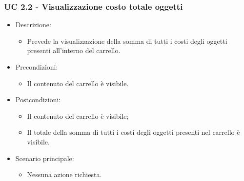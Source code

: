 \subsubsection{UC 2.2 - Visualizzazione costo totale oggetti}
\begin{itemize}
	
	\item Descrizione:
	\begin{itemize}
		\item Prevede la visualizzazione della somma di tutti i costi degli oggetti presenti all'interno del carrello.
	\end{itemize}
	
	\item Precondizioni:
	\begin{itemize}
		\item Il contenuto del carrello è visibile.
	\end{itemize}
	
	\item Postcondizioni:
	\begin{itemize}
		\item Il contenuto del carrello è visibile;
		\item Il totale della somma di tutti i costi degli oggetti presenti nel carrello è visibile.
	\end{itemize}
	
	\item Scenario principale:
	\begin{itemize}
		\item Nessuna azione richiesta.
	\end{itemize}
	
\end{itemize}

